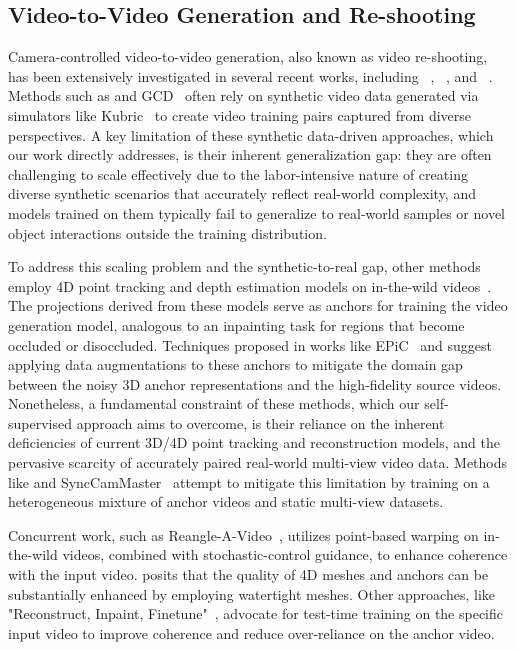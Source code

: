 \subsection{Video-to-Video Generation and Re-shooting}
Camera-controlled video-to-video generation, also known as video re-shooting, has been extensively investigated in several recent works, including \recammaster{}~\cite{bai2025recammaster}, \exfd{}~\cite{ex4d}, and \trajectorycrafter{}~\cite{yu2025trajectorycrafter}. Methods such as \recammaster{} and GCD~\cite{gcd} often rely on synthetic video data generated via simulators like Kubric~\cite{greff2022kubric} to create video training pairs captured from diverse perspectives. A key limitation of these synthetic data-driven approaches, which our work directly addresses, is their inherent generalization gap: they are often challenging to scale effectively due to the labor-intensive nature of creating diverse synthetic scenarios that accurately reflect real-world complexity, and models trained on them typically fail to generalize to real-world samples or novel object interactions outside the training distribution.

To address this scaling problem and the synthetic-to-real gap, other methods employ 4D point tracking and depth estimation models on in-the-wild videos~\cite{ex4d,jeong2025reangle,chen2025reconstruct}. The projections derived from these models serve as anchors for training the video generation model, analogous to an inpainting task for regions that become occluded or disoccluded. Techniques proposed in works like EPiC~\cite{wang2025epic} and \recammaster{} suggest applying data augmentations to these anchors to mitigate the domain gap between the noisy 3D anchor representations and the high-fidelity source videos. Nonetheless, a fundamental constraint of these methods, which our self-supervised approach aims to overcome, is their reliance on the inherent deficiencies of current 3D/4D point tracking and reconstruction models, and the pervasive scarcity of accurately paired real-world multi-view video data. Methods like \trajectorycrafter\cite{yu2025trajectorycrafter} and SyncCamMaster~\cite{bai2024syncammaster} attempt to mitigate this limitation by training on a heterogeneous mixture of anchor videos and static multi-view datasets.

Concurrent work, such as Reangle-A-Video~\cite{jeong2025reangle}, utilizes point-based warping on in-the-wild videos, combined with stochastic-control guidance, to enhance coherence with the input video. \exfd{} posits that the quality of 4D meshes and anchors can be substantially enhanced by employing watertight meshes. Other approaches, like "Reconstruct, Inpaint, Finetune"~\cite{chen2025reconstruct}, advocate for test-time training on the specific input video to improve coherence and reduce over-reliance on the anchor video.

